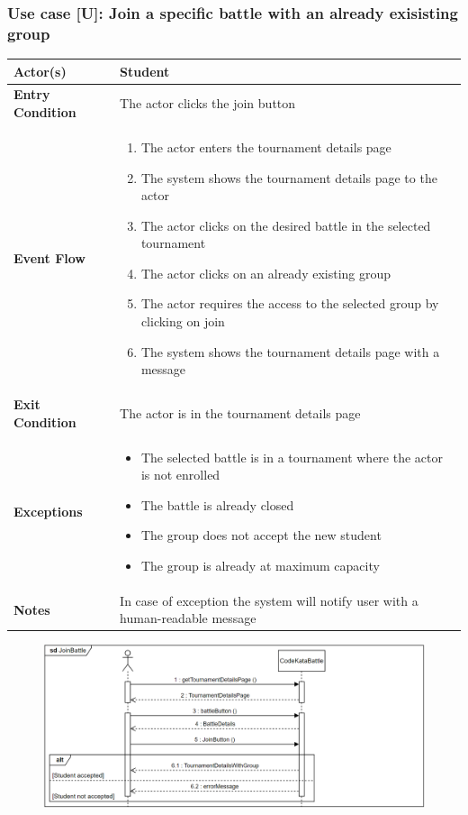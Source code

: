 \documentclass[12pt, a4paper]{report}
\newcounter{useCase}
\newcommand{\usecase}[9]{
    \def\arraystretch{1.5} 
    \subsubsection*{Use case [U#2]: #3}
    \vspace*{0.2cm}
    \begin{center}
        \begin{tabular}{|l|p{12cm}|}
            \hline
            \textbf{Actor(s)} & #4 \\
            \hline
            \textbf{Entry Condition} & #5 \\
            \hline
            \textbf{Event Flow} & #6 \\
            \hline
            \textbf{Exit Condition} & #7 \\
            \hline
            \textbf{Exceptions} & #8 \\
            \hline
            \textbf{Notes} & #9 \\
            \hline
        \end{tabular}
    \end{center}
    #1
}
\begin{document}
        \usecase{\begin{figure}[H]\centering\includegraphics[width=0.9\linewidth]{images/joinbattle1.png}\end{figure}}        
        {\arabic{useCase}\stepcounter{useCase}}
        {Join a specific battle with an already exisisting group}
        {Student}
        {The actor clicks the join button}
        {
        \begin{enumerate}
            \item The actor enters the tournament details page
            \item The system shows the tournament details page to the actor
            \item The actor clicks on the desired battle in the selected tournament
            \item The actor clicks on an already existing group
            \item The actor requires the access to the selected group by clicking on join
            \item The system shows the tournament details page with a message
        \end{enumerate}
        }
        {The actor is in the tournament details page}
        {
        \begin{itemize}
            \item The selected battle is in a tournament where the actor is not enrolled
            \item The battle is already closed
            \item The group does not accept the new student
            \item The group is already at maximum capacity
        \end{itemize}
        }
        {In case of exception the system will notify user with a human-readable message}
\end{document}
